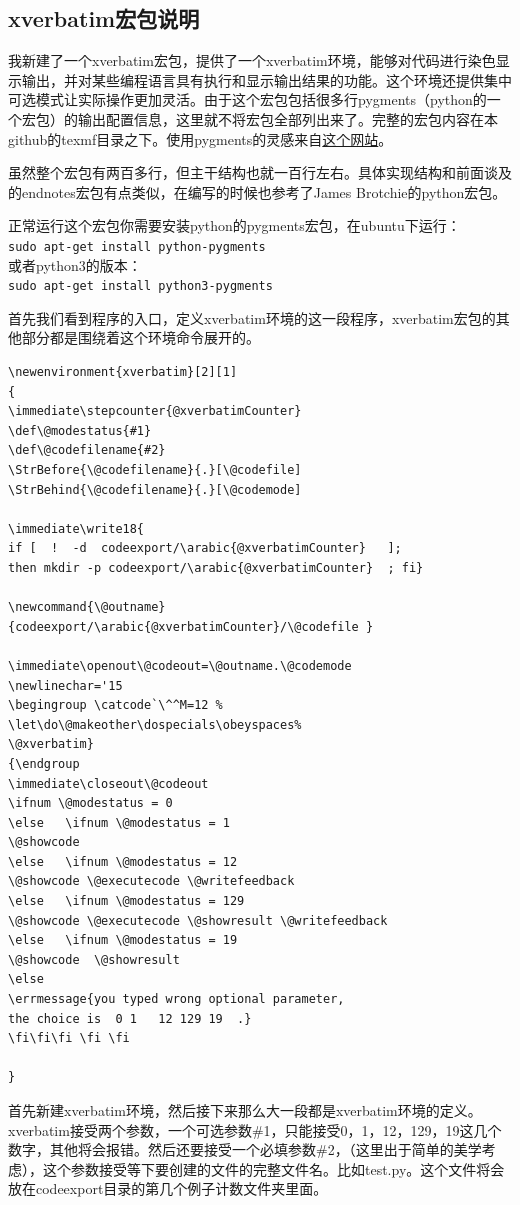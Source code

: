 \documentclass[12pt,oneside]{book}
\begin{document}
\begin{common-format}
\subsection{xverbatim宏包说明}
我新建了一个xverbatim宏包，提供了一个xverbatim环境，能够对代码进行染色显示输出，并对某些编程语言具有执行和显示输出结果的功能。这个环境还提供集中可选模式让实际操作更加灵活。由于这个宏包包括很多行pygments（python的一个宏包）的输出配置信息，这里就不将宏包全部列出来了。完整的宏包内容在本github的texmf目录之下。使用pygments的灵感来自\href{http://scott.sherrillmix.com/blog/programmer/displaying-code-in-latex/}{这个网站}。

虽然整个宏包有两百多行，但主干结构也就一百行左右。具体实现结构和前面谈及的endnotes宏包有点类似，在编写的时候也参考了James Brotchie的python宏包。

正常运行这个宏包你需要安装python的pygments宏包，在ubuntu下运行：\\
\verb+sudo apt-get install python-pygments+\\
或者python3的版本：\\
\verb+sudo apt-get install python3-pygments+

首先我们看到程序的入口，定义xverbatim环境的这一段程序，xverbatim宏包的其他部分都是围绕着这个环境命令展开的。
\begin{Verbatim}
\newenvironment{xverbatim}[2][1]
{
\immediate\stepcounter{@xverbatimCounter}
\def\@modestatus{#1}
\def\@codefilename{#2}
\StrBefore{\@codefilename}{.}[\@codefile]
\StrBehind{\@codefilename}{.}[\@codemode]

\immediate\write18{
if [  !  -d  codeexport/\arabic{@xverbatimCounter}   ];
then mkdir -p codeexport/\arabic{@xverbatimCounter}  ; fi}

\newcommand{\@outname}
{codeexport/\arabic{@xverbatimCounter}/\@codefile }

\immediate\openout\@codeout=\@outname.\@codemode
\newlinechar='15
\begingroup \catcode`\^^M=12 %
\let\do\@makeother\dospecials\obeyspaces%
\@xverbatim}
{\endgroup
\immediate\closeout\@codeout
\ifnum \@modestatus = 0
\else   \ifnum \@modestatus = 1    
\@showcode
\else   \ifnum \@modestatus = 12   
\@showcode \@executecode \@writefeedback
\else   \ifnum \@modestatus = 129   
\@showcode \@executecode \@showresult \@writefeedback
\else   \ifnum \@modestatus = 19  
\@showcode  \@showresult
\else    
\errmessage{you typed wrong optional parameter,
the choice is  0 1   12 129 19  .}
\fi\fi\fi \fi \fi

}
\end{Verbatim}
首先新建xverbatim环境，然后接下来那么大一段都是xverbatim环境的定义。xverbatim接受两个参数，一个可选参数\#{}1，只能接受0，1，12，129，19这几个数字，其他将会报错。然后还要接受一个必填参数\#{}2，（这里出于简单的美学考虑），这个参数接受等下要创建的文件的完整文件名。比如test.py。这个文件将会放在codeexport目录的第几个例子计数文件夹里面。


\end{common-format}
\end{document}

